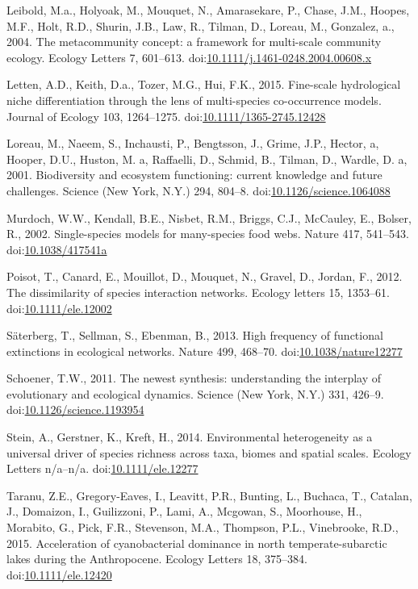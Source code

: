 \hypertarget{ref-Leibold2004}{}
Leibold, M.a., Holyoak, M., Mouquet, N., Amarasekare, P., Chase, J.M.,
Hoopes, M.F., Holt, R.D., Shurin, J.B., Law, R., Tilman, D., Loreau, M.,
Gonzalez, a., 2004. The metacommunity concept: a framework for
multi-scale community ecology. Ecology Letters 7, 601--613.
doi:\href{https://doi.org/10.1111/j.1461-0248.2004.00608.x}{10.1111/j.1461-0248.2004.00608.x}

\hypertarget{ref-Letten2015}{}
Letten, A.D., Keith, D.a., Tozer, M.G., Hui, F.K., 2015. Fine-scale
hydrological niche differentiation through the lens of multi-species
co-occurrence models. Journal of Ecology 103, 1264--1275.
doi:\href{https://doi.org/10.1111/1365-2745.12428}{10.1111/1365-2745.12428}

\hypertarget{ref-Loreau2001}{}
Loreau, M., Naeem, S., Inchausti, P., Bengtsson, J., Grime, J.P.,
Hector, a, Hooper, D.U., Huston, M. a, Raffaelli, D., Schmid, B.,
Tilman, D., Wardle, D. a, 2001. Biodiversity and ecosystem functioning:
current knowledge and future challenges. Science (New York, N.Y.) 294,
804--8.
doi:\href{https://doi.org/10.1126/science.1064088}{10.1126/science.1064088}

\hypertarget{ref-Murdoch2002}{}
Murdoch, W.W., Kendall, B.E., Nisbet, R.M., Briggs, C.J., McCauley, E.,
Bolser, R., 2002. Single-species models for many-species food webs.
Nature 417, 541--543.
doi:\href{https://doi.org/10.1038/417541a}{10.1038/417541a}

\hypertarget{ref-Poisot2012}{}
Poisot, T., Canard, E., Mouillot, D., Mouquet, N., Gravel, D., Jordan,
F., 2012. The dissimilarity of species interaction networks. Ecology
letters 15, 1353--61.
doi:\href{https://doi.org/10.1111/ele.12002}{10.1111/ele.12002}

\hypertarget{ref-Saterberg2013}{}
Säterberg, T., Sellman, S., Ebenman, B., 2013. High frequency of
functional extinctions in ecological networks. Nature 499, 468--70.
doi:\href{https://doi.org/10.1038/nature12277}{10.1038/nature12277}

\hypertarget{ref-Schoener2011}{}
Schoener, T.W., 2011. The newest synthesis: understanding the interplay
of evolutionary and ecological dynamics. Science (New York, N.Y.) 331,
426--9.
doi:\href{https://doi.org/10.1126/science.1193954}{10.1126/science.1193954}

\hypertarget{ref-Stein2014}{}
Stein, A., Gerstner, K., Kreft, H., 2014. Environmental heterogeneity as
a universal driver of species richness across taxa, biomes and spatial
scales. Ecology Letters n/a--n/a.
doi:\href{https://doi.org/10.1111/ele.12277}{10.1111/ele.12277}

\hypertarget{ref-Taranu2015}{}
Taranu, Z.E., Gregory-Eaves, I., Leavitt, P.R., Bunting, L., Buchaca,
T., Catalan, J., Domaizon, I., Guilizzoni, P., Lami, A., Mcgowan, S.,
Moorhouse, H., Morabito, G., Pick, F.R., Stevenson, M.A., Thompson,
P.L., Vinebrooke, R.D., 2015. Acceleration of cyanobacterial dominance
in north temperate-subarctic lakes during the Anthropocene. Ecology
Letters 18, 375--384.
doi:\href{https://doi.org/10.1111/ele.12420}{10.1111/ele.12420}

